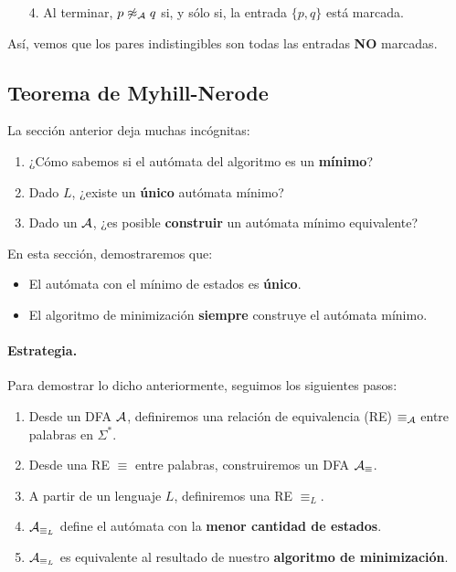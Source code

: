 \begin{enumerate}
    \item[4.] Al terminar, $p \not\approx_{\mathcal{A}} q$ si, y sólo si, la entrada $\{p,q\}$ está marcada.
\end{enumerate}

Así, vemos que los pares indistingibles son todas las entradas \textbf{NO} marcadas.

\subsection{Teorema de Myhill-Nerode}

La sección anterior deja muchas incógnitas:
\begin{enumerate}
    \item ¿Cómo sabemos si el autómata del algoritmo es un \textbf{mínimo}?
    \item Dado $L$, ¿existe un \textbf{único} autómata mínimo?
    \item Dado un $\mathcal{A}$, ¿es posible \textbf{construir} un autómata mínimo equivalente?
\end{enumerate}

En esta sección, demostraremos que:
\begin{itemize}
    \item El autómata con el mínimo de estados es \textbf{único}.
    \item El algoritmo de minimización \textbf{siempre} construye el autómata mínimo.
\end{itemize}

\paragraph{Estrategia.} Para demostrar lo dicho anteriormente, seguimos los siguientes pasos:
\begin{enumerate}
    \item Desde un DFA $\mathcal{A}$, definiremos una relación de equivalencia (RE) $\equiv_{\mathcal{A}}$ entre palabras en $\Sigma^*$.
    \item Desde una RE $\equiv$ entre palabras, construiremos un DFA $\mathcal{A}_\equiv$.
    \item A partir de un lenguaje $L$, definiremos una RE $\equiv_L$.
    \item $\mathcal{A}_{\equiv_L}$ define el autómata con la \textbf{menor cantidad de estados}.
    \item $\mathcal{A}_{\equiv_L}$ es equivalente al resultado de nuestro \textbf{algoritmo de minimización}.
\end{enumerate}

